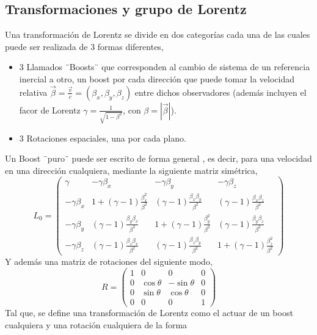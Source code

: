 \documentclass[12pt,letterpaper]{article}
\begin{document}
\subsection{Transformaciones y grupo de Lorentz}
Una transformación de Lorentz se divide en dos categorías cada una de las cuales puede ser realizada de 3 formas diferentes,
\begin{itemize}
  \item 3 Llamados ¨Boosts¨ que corresponden al cambio de sistema de un referencia inercial a otro, un boost por cada dirección que puede tomar la velocidad relativa $\vec{\beta}=\frac{\vec{v}}{c}=(\beta_x,\beta_y,\beta_z)$ entre dichos observadores (además incluyen el facor de Lorentz $\gamma=\frac{1}{\sqrt{1-\beta^2}}$, con $\beta=|\vec{\beta}|$).
  \item 3 Rotaciones espaciales, una por cada plano.
\end{itemize}
Un Boost ¨puro¨ puede ser escrito de forma general \cite{goldstein}, es decir, para una velocidad en una dirección cualquiera, mediante la siguiente matriz simétrica,
\begin{equation}
  L_0 = \begin{pmatrix}
    \gamma & -\gamma \beta_x & -\gamma\beta_y & -\gamma\beta_z \\
    -\gamma \beta_x & 1 + (\gamma-1)\frac{\beta_x^2}{\beta^2} & (\gamma-1)\frac{\beta_x\beta_y}{\beta^2} & (\gamma-1)\frac{\beta_x\beta_z}{\beta^2} \\
    -\gamma\beta_y & (\gamma-1)\frac{\beta_y\beta_x}{\beta^2} & 1+(\gamma-1)\frac{\beta_y^2}{\beta^2} & (\gamma-1)\frac{\beta_y\beta_z}{\beta^2} \\
    -\gamma\beta_z & (\gamma-1)\frac{\beta_z\beta_x}{\beta^2} & (\gamma-1)\frac{\beta_z\beta_y}{\beta^2} & 1+(\gamma-1)\frac{\beta_z^2}{\beta^2}
  \end{pmatrix}
\end{equation}
Y además una matriz de rotaciones del siguiente modo,
\begin{equation}
  R = \begin{pmatrix}
    1 & 0 & 0 & 0 \\
    0 & \cos{\theta} & -\sin{\theta} & 0 \\
    0 & \sin{\theta} & \cos{\theta} & 0 \\
    0 & 0 & 0 & 1
  \end{pmatrix}
\end{equation}
Tal que, se define una transformación de Lorentz como el actuar de un boost cualquiera y una rotación cualquiera de la forma
\end{document}
